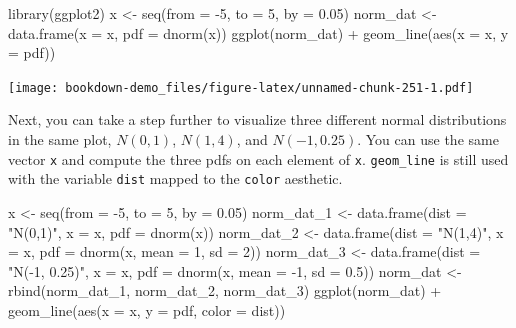 \documentclass[
]{book}
\newenvironment{Shaded}{\begin{snugshade}}{\end{snugshade}}
\newcommand{\AttributeTok}[1]{\textcolor[rgb]{0.77,0.63,0.00}{#1}}
\newcommand{\DecValTok}[1]{\textcolor[rgb]{0.00,0.00,0.81}{#1}}
\newcommand{\FloatTok}[1]{\textcolor[rgb]{0.00,0.00,0.81}{#1}}
\newcommand{\FunctionTok}[1]{\textcolor[rgb]{0.00,0.00,0.00}{#1}}
\newcommand{\NormalTok}[1]{#1}
\newcommand{\OtherTok}[1]{\textcolor[rgb]{0.56,0.35,0.01}{#1}}
\newcommand{\SpecialCharTok}[1]{\textcolor[rgb]{0.00,0.00,0.00}{#1}}
\newcommand{\StringTok}[1]{\textcolor[rgb]{0.31,0.60,0.02}{#1}}
\begin{document}
\begin{Shaded}
\begin{Highlighting}[]
\FunctionTok{library}\NormalTok{(ggplot2)}
\NormalTok{x }\OtherTok{\textless{}{-}} \FunctionTok{seq}\NormalTok{(}\AttributeTok{from =} \SpecialCharTok{{-}}\DecValTok{5}\NormalTok{, }\AttributeTok{to =} \DecValTok{5}\NormalTok{, }\AttributeTok{by =} \FloatTok{0.05}\NormalTok{)}
\NormalTok{norm\_dat }\OtherTok{\textless{}{-}} \FunctionTok{data.frame}\NormalTok{(}\AttributeTok{x =}\NormalTok{ x, }\AttributeTok{pdf =} \FunctionTok{dnorm}\NormalTok{(x))}
\FunctionTok{ggplot}\NormalTok{(norm\_dat) }\SpecialCharTok{+} \FunctionTok{geom\_line}\NormalTok{(}\FunctionTok{aes}\NormalTok{(}\AttributeTok{x =}\NormalTok{ x, }\AttributeTok{y =}\NormalTok{ pdf))}
\end{Highlighting}
\end{Shaded}

\texttt{[image: bookdown-demo\_files/figure-latex/unnamed-chunk-251-1.pdf]}

Next, you can take a step further to visualize three different normal distributions in the same plot, \(N(0,1)\), \(N(1,4)\), and \(N(-1, 0.25)\). You can use the same vector \texttt{x} and compute the three pdfs on each element of \texttt{x}. \texttt{geom\_line} is still used with the variable \texttt{dist} mapped to the \texttt{color} aesthetic.

\begin{Shaded}
\begin{Highlighting}[]
\NormalTok{x }\OtherTok{\textless{}{-}} \FunctionTok{seq}\NormalTok{(}\AttributeTok{from =} \SpecialCharTok{{-}}\DecValTok{5}\NormalTok{, }\AttributeTok{to =} \DecValTok{5}\NormalTok{, }\AttributeTok{by =} \FloatTok{0.05}\NormalTok{)}
\NormalTok{norm\_dat\_1 }\OtherTok{\textless{}{-}} \FunctionTok{data.frame}\NormalTok{(}\AttributeTok{dist =} \StringTok{"N(0,1)"}\NormalTok{, }\AttributeTok{x =}\NormalTok{ x, }\AttributeTok{pdf =} \FunctionTok{dnorm}\NormalTok{(x))}
\NormalTok{norm\_dat\_2 }\OtherTok{\textless{}{-}} \FunctionTok{data.frame}\NormalTok{(}\AttributeTok{dist =} \StringTok{"N(1,4)"}\NormalTok{, }\AttributeTok{x =}\NormalTok{ x, }\AttributeTok{pdf =} \FunctionTok{dnorm}\NormalTok{(x, }\AttributeTok{mean =} \DecValTok{1}\NormalTok{, }\AttributeTok{sd =} \DecValTok{2}\NormalTok{))}
\NormalTok{norm\_dat\_3 }\OtherTok{\textless{}{-}} \FunctionTok{data.frame}\NormalTok{(}\AttributeTok{dist =} \StringTok{"N({-}1, 0.25)"}\NormalTok{, }\AttributeTok{x =}\NormalTok{ x, }\AttributeTok{pdf =} \FunctionTok{dnorm}\NormalTok{(x, }\AttributeTok{mean =} \SpecialCharTok{{-}}\DecValTok{1}\NormalTok{, }\AttributeTok{sd =} \FloatTok{0.5}\NormalTok{))}
\NormalTok{norm\_dat }\OtherTok{\textless{}{-}} \FunctionTok{rbind}\NormalTok{(norm\_dat\_1, norm\_dat\_2, norm\_dat\_3)}
\FunctionTok{ggplot}\NormalTok{(norm\_dat) }\SpecialCharTok{+} \FunctionTok{geom\_line}\NormalTok{(}\FunctionTok{aes}\NormalTok{(}\AttributeTok{x =}\NormalTok{ x, }\AttributeTok{y =}\NormalTok{ pdf, }\AttributeTok{color =}\NormalTok{ dist))}
\end{Highlighting}
\end{Shaded}
\end{document}
